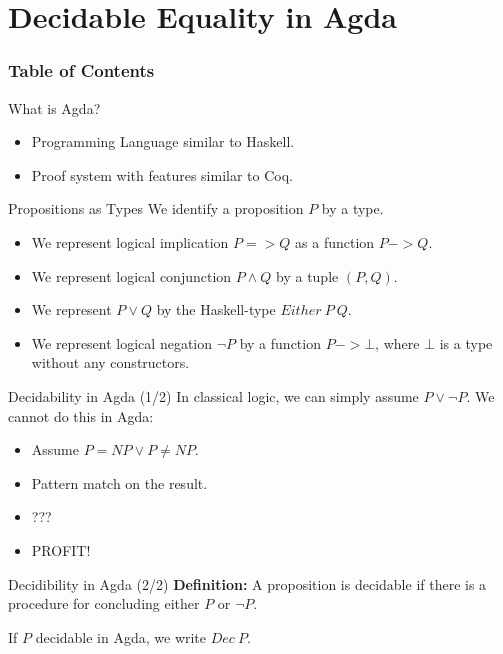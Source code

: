 \section{Decidable Equality in Agda}
\begin{frame}
\frametitle{Table of Contents}
\tableofcontents[currentsection]
\end{frame}

\begin{frame}{What is Agda?}
  \begin{itemize}
  \item Programming Language similar to Haskell.
  \item Proof system with features similar to Coq.
  \end{itemize}
\end{frame}

\begin{frame}{Propositions as Types}
  We identify a proposition $P$ by a type.

  \begin{itemize}
  \item We represent logical implication $P => Q$ as a function $P -> Q$.
  \item We represent logical conjunction $P \land Q$ by a tuple $(P, Q)$.
  \item We represent $P \lor Q$ by the Haskell-type $Either\ P\ Q$.
  \item We represent logical negation $\neg P$ by a function $P -> \bot$, where
    $\bot$ is a type without any constructors.
  \end{itemize}
\end{frame}

\begin{frame}{Decidability in Agda (1/2)}
  In classical logic, we can simply assume $P \lor \neg P$. We cannot do this in
  Agda:

  \begin{itemize}
  \item Assume $P = NP \lor P \neq NP$.
  \item Pattern match on the result.
  \item ???
  \item PROFIT!
  \end{itemize}
\end{frame}

\begin{frame}{Decidibility in Agda (2/2)}
  \textbf{Definition:} A proposition is decidable if there is a procedure for
  concluding either $P$ or $\neg P$.

  \pause If $P$ decidable in Agda, we write $Dec\ P$.
\end{frame}

